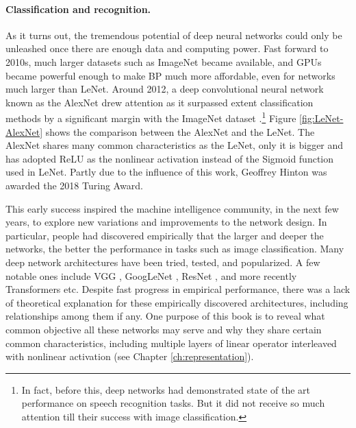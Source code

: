 \documentclass[../../book-main.tex]{subfiles}
\begin{document}
\paragraph{Classification and recognition.}
As it turns out, the tremendous potential of deep neural networks could only be unleashed once there are enough data and computing power. Fast forward to 2010s, much larger datasets such as ImageNet became available, and GPUs became powerful enough to make BP much more affordable, even for networks much larger than LeNet. Around 2012, a deep convolutional neural network known as the AlexNet drew attention as it surpassed extent classification methods by a significant margin with the ImageNet dataset \cite{krizhevsky2012imagenet}.\footnote{In fact, before this, deep networks had demonstrated state of the art performance on speech recognition tasks. But it did not receive so much attention till their success with image classification.} Figure \ref{fig:LeNet-AlexNet} shows the comparison between the AlexNet and the LeNet. The AlexNet shares many common characteristics as the LeNet, only it is bigger and has adopted ReLU as the nonlinear activation instead of the Sigmoid function used in LeNet. Partly due to the influence of this work, Geoffrey Hinton was awarded the 2018 Turing Award.


This early success inspired the machine intelligence community, in the next few years, to explore new variations and improvements to the network design. In particular, people had discovered empirically that the larger and deeper the networks, the better the performance in tasks such as image classification. Many deep network architectures have been tried, tested, and popularized. A few notable ones include VGG \cite{Simonyan15}, GoogLeNet \cite{Szegedy2014GoingDW}, ResNet \cite{He2016-lc}, and more recently Transformers \cite{vaswani2017attention} etc. Despite fast progress in empirical performance, there was a lack of theoretical explanation for these empirically discovered architectures, including relationships among them if any. One purpose of this book is to reveal what common objective all these networks may serve and why they share certain common characteristics, including multiple layers of linear operator interleaved with nonlinear activation (see Chapter \ref{ch:representation}). 
\end{document}

